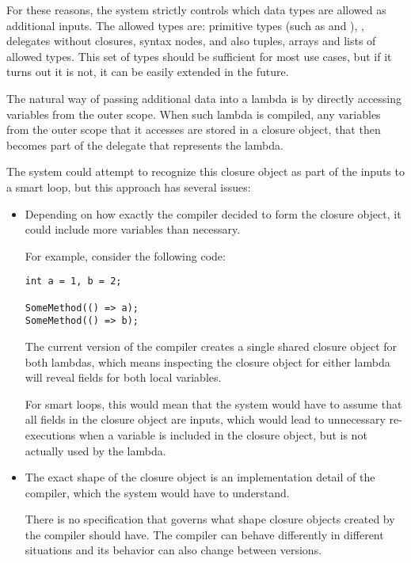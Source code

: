 \begin{itemize}
For these reasons, the system strictly controls which data types are allowed as additional inputs. The allowed types are: primitive types (such as  and ), , delegates without closures, syntax nodes, and also tuples, arrays and lists of allowed types. This set of types should be sufficient for most use cases, but if it turns out it is not, it can be easily extended in the future.

\medskip

The natural way of passing additional data into a lambda is by directly accessing variables from the outer scope. When such lambda is compiled, any variables from the outer scope that it accesses are stored in a closure object, that then becomes part of the delegate that represents the lambda.

The system could attempt to recognize this closure object as part of the inputs to a smart loop, but this approach has several issues:

\begin{itemize}
\item Depending on how exactly the compiler decided to form the closure object, it could include more variables than necessary.

For example, consider the following code:

\begin{verbatim}
int a = 1, b = 2;

SomeMethod(() => a);
SomeMethod(() => b);
\end{verbatim}

The current version of the compiler creates a single shared closure object for both lambdas, which means inspecting the closure object for either lambda will reveal fields for both local variables.

For smart loops, this would mean that the system would have to assume that all fields in the closure object are inputs, which would lead to unnecessary re-executions when a variable is included in the closure object, but is not actually used by the lambda.

\item The exact shape of the closure object is an implementation detail of the compiler, which the system would have to understand.

There is no specification that governs what shape closure objects created by the compiler should have. The compiler can behave differently in different situations and its behavior can also change between versions.


\end{itemize}
\end{itemize}
